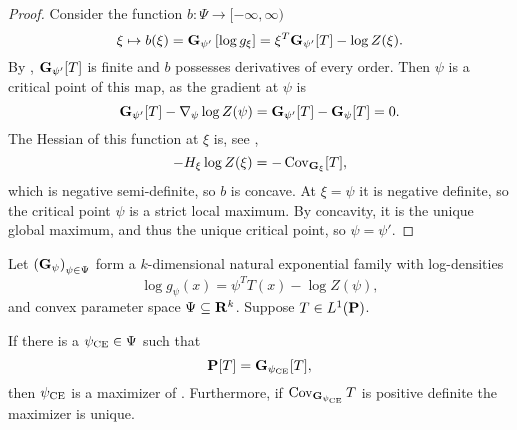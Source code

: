\begin{proof}
    Consider the function $b: \Psi \to [-\infty, \infty)$
    $$
        \xi \mapsto b(\xi) = \G_{\psi'} \left[ \log g_{\xi} \right] = \xi^{T}\G_{\psi'} [T] - \log Z(\xi).
    $$
    By , $\G_{\psi'}[T]$ is finite and $b$ possesses derivatives of every order.
    Then $\psi$ is a critical point of this map, as the gradient at $\psi$ is
    $$
        \G_{\psi'} [T] - \nabla_{\psi} \log Z(\psi) = \G_{\psi'}[T] - \G_{\psi}[T] = 0.
    $$
    The Hessian of this function at $\xi$ is, see ,
    $$
        -H_{\xi} \log Z(\xi) = - \cov_{\G_{\xi}} [T],
    $$
    which is negative semi-definite, so $b$ is concave. At $\xi = \psi$ it is negative definite, so the critical point $\psi$ is a strict local maximum. By concavity, it is the unique global maximum, and thus the unique critical point, so $\psi = \psi'$.
\end{proof}

\begin{proposition}
    \label{prop:cem_exponential_families}
    Let $\left( \G_{\psi} \right)_{\psi \in \Psi}$ form a $k$-dimensional natural exponential family with log-densities 
    $$
    \log g_{\psi}(x) = \psi^{T} T(x) - \log Z(\psi),
    $$
    and convex parameter space $\Psi \subseteq \R^{k}$. 
    Suppose $T \in L^{1}(\P)$.

    If there is a $\pce \in \Psi$ such that 
    $$
    \P[T] = \G_{\pce} [T],
    $$
    then $\pce$ is a maximizer of . Furthermore, if $\cov_{\G_{\pce}} T$ is positive definite the maximizer is unique.
\end{proposition}

